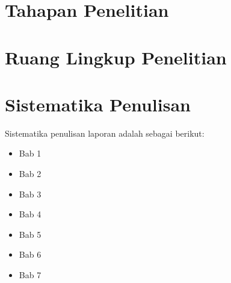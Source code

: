 \section{Tahapan Penelitian}
\section{Ruang Lingkup Penelitian}

\section{Sistematika Penulisan}
Sistematika penulisan laporan adalah sebagai berikut:
\begin{itemize}
	\item Bab 1 \babSatu \\
	\item Bab 2 \babDua \\
	\item Bab 3 \babTiga \\
	\item Bab 4 \babEmpat \\
	\item Bab 5 \babLima \\
	\item Bab 6 \babEnam \\
	\item Bab 7 \babTujuh \\
\end{itemize}

